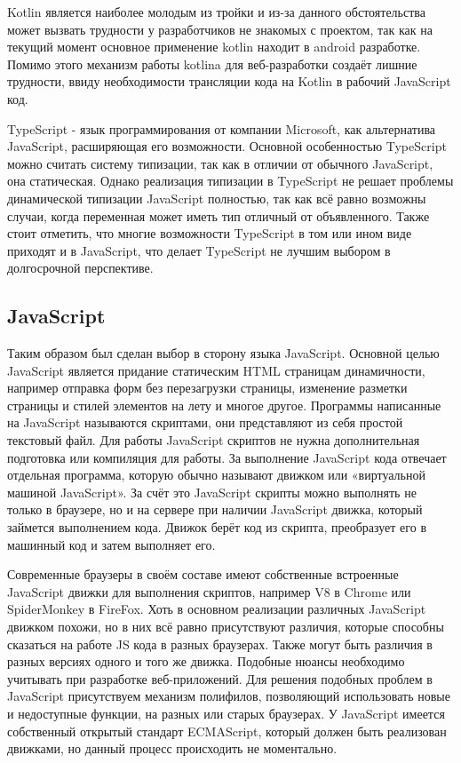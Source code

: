 Kotlin является наиболее молодым из тройки и из-за данного обстоятельства может вызвать трудности у разработчиков не знакомых с проектом, так как на текущий момент основное применение kotlin находит в android  разработке. Помимо этого механизм работы kotlina для веб-разработки создаёт лишние трудности, ввиду необходимости трансляции кода на Kotlin в рабочий JavaScript код.
 
TypeScript - язык программирования от компании Microsoft, как альтернатива JavaScript, расширяющая его возможности. 
Основной особенностью TypeScript можно считать систему типизации, так как в отличии от обычного JavaScript, она статическая.
Однако реализация типизации в TypeScript не решает проблемы динамической типизации JavaScript полностью, так как всё равно возможны случаи, когда переменная может иметь тип отличный от объявленного.
Также стоит отметить, что многие возможности TypeScript в том или ином виде приходят и в JavaScript, что делает TypeScript не лучшим выбором в долгосрочной перспективе.
 
\subsection{JavaScript}
Таким образом был сделан выбор в сторону языка JavaScript. Основной целью JavaScript является придание статическим HTML страницам динамичности, например отправка форм без перезагрузки страницы, изменение разметки страницы и стилей элементов на лету и многое другое. Программы написанные на JavaScript называются скриптами, они представляют из себя простой текстовый файл. Для работы JavaScript скриптов не нужна дополнительная подготовка или компиляция для работы. За выполнение JavaScript кода отвечает отдельная программа, которую обычно называют движком или «виртуальной машиной JavaScript». За счёт это JavaScript скрипты можно выполнять не только в браузере, но и на сервере при наличии JavaScript движка, который займется выполнением кода. Движок берёт код из скрипта, преобразует его в машинный код и затем выполняет его.
 
Современные браузеры в своём составе имеют собственные встроенные JavaScript движки для выполнения скриптов, например V8 в Chrome или SpiderMonkey в FireFox\cite{js3}. Хоть в основном реализации различных JavaScript движком похожи, но в них всё равно присутствуют различия, которые способны сказаться на работе JS кода в разных браузерах. Также могут быть различия в разных версиях одного и того же движка. Подобные нюансы необходимо учитывать при разработке веб-приложений. Для решения подобных проблем в JavaScript присутствуем механизм полифилов, позволяющий использовать новые и недоступные функции, на разных или старых браузерах. У JavaScript имеется собственный открытый стандарт ECMAScript, который должен быть реализован движками, но данный процесс происходить не моментально.
 
